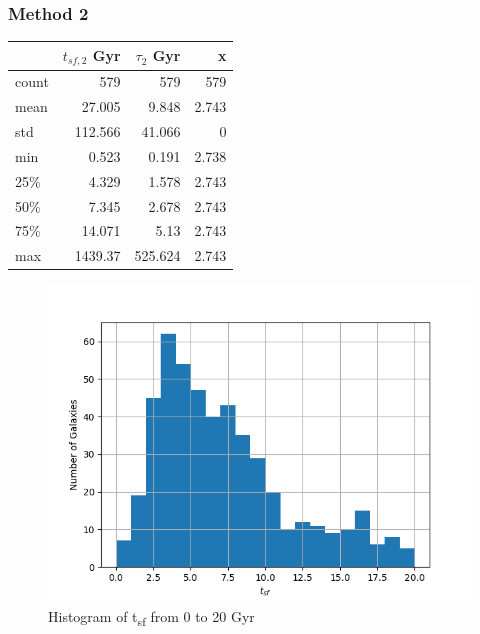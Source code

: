 \documentclass[a4paper,twocolumn]{article}
\begin{document}
\subsubsection{Method 2}
\label{sec:org21a3006}
\begin{center}
\begin{tabular}{lrrr}
 & \(t_{sf,2}\) Gyr & \(\tau_2\) Gyr & x\\[0pt]
\hline
count & 579 & 579 & 579\\[0pt]
mean & 27.005 & 9.848 & 2.743\\[0pt]
std & 112.566 & 41.066 & 0\\[0pt]
min & 0.523 & 0.191 & 2.738\\[0pt]
25\% & 4.329 & 1.578 & 2.743\\[0pt]
50\% & 7.345 & 2.678 & 2.743\\[0pt]
75\% & 14.071 & 5.13 & 2.743\\[0pt]
max & 1439.37 & 525.624 & 2.743\\[0pt]
\end{tabular}
\end{center}

\begin{figure}[!htpb]
\centering
\includegraphics[width=.9\linewidth]{./figs/tsf2-hist.png}
\caption{\label{fig:Histogram of t_{sf} from 0 to 20 Gyr}Histogram of t\textsubscript{sf} from 0 to 20 Gyr}
\end{figure}
\end{document}
